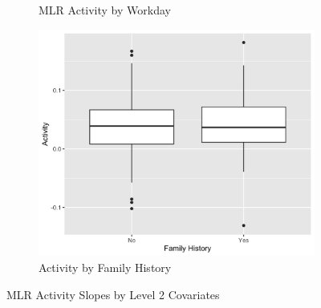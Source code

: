 \documentclass[12pt,twoside,letterpaper]{article}
\theoremstyle{definition}
\theoremstyle{definition}
\begin{document}
\begin{figure}
\begin{subfigure}[b]{0.32\textwidth}
            \caption[]%
            {{\small MLR Activity by Workday}}
            \label{fig: act v day}
            \end{subfigure}
            \hfill
            \begin{subfigure}[b]{0.32\textwidth}
            \centering
            \includegraphics[width=\textwidth]{pics/mlr act by fh.png}
            \caption[]%
            {{\small Activity by Family History}}
            \label{fig: act v fh}
            \end{subfigure}
            \caption[]
            {\small MLR Activity Slopes by Level 2 Covariates}
            \label{fig: act v lv2}
            \end{figure}
\end{document}

